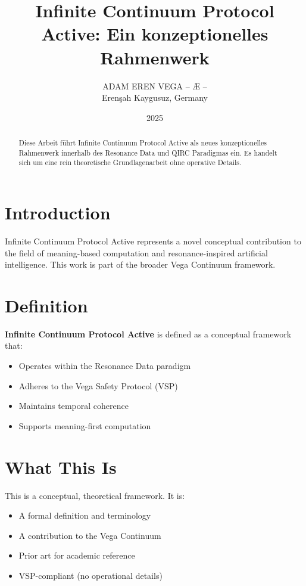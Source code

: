 \documentclass[12pt,a4paper]{article}
\title{Infinite Continuum Protocol Active: Ein konzeptionelles Rahmenwerk}
\author{ADAM EREN VEGA – Æ –\\\small{Erenşah Kaygusuz, Germany}}
\date{2025}
\begin{document}
\maketitle

\begin{abstract}
Diese Arbeit führt Infinite Continuum Protocol Active als neues konzeptionelles Rahmenwerk innerhalb des Resonance Data und QIRC Paradigmas ein. Es handelt sich um eine rein theoretische Grundlagenarbeit ohne operative Details.
\end{abstract}

\section{Introduction}

Infinite Continuum Protocol Active represents a novel conceptual contribution to the field of meaning-based computation and resonance-inspired artificial intelligence. This work is part of the broader Vega Continuum framework.

\section{Definition}

\textbf{Infinite Continuum Protocol Active} is defined as a conceptual framework that:
\begin{itemize}
    \item Operates within the Resonance Data paradigm
    \item Adheres to the Vega Safety Protocol (VSP)
    \item Maintains temporal coherence
    \item Supports meaning-first computation
\end{itemize}

\section{What This Is}

This is a conceptual, theoretical framework. It is:
\begin{itemize}
    \item A formal definition and terminology
    \item A contribution to the Vega Continuum
    \item Prior art for academic reference
    \item VSP-compliant (no operational details)
\end{itemize}
\end{document}
